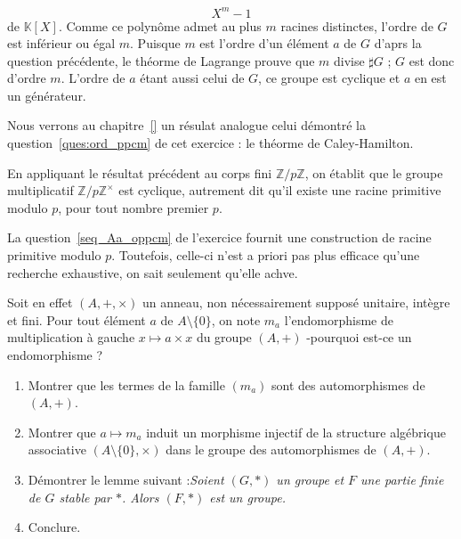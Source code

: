 \begin{sol}
\begin{enumerate}
\begin{equation}
X^m - 1
\label{}
\end{equation}
de \(\mathbb{K}[X]\). %
Comme ce polyn\^ome admet au plus \(m\) racines distinctes, l'ordre de \(G\) est inf\'erieur ou \'egal  \(m\). %
Puisque \(m\) est l'ordre d'un \'el\'ement \(a\) de \(G\) d'aprs la question pr\'ec\'edente, %
le th\'eorme de Lagrange prouve que \(m\) divise \(\sharp G\) ; %
\(G\) est donc d'ordre \(m\). %
L'ordre de \(a\) \'etant aussi celui de \(G\), ce groupe est cyclique et \(a\) en est un g\'en\'erateur.
\end{enumerate}
\end{sol}

\begin{rema}
Nous verrons au chapitre~\ref{} un r\'esulat analogue  celui d\'emontr\'e  la question~\ref{ques:ord_ppcm} de cet exercice : %
le th\'eorme de Caley-Hamilton.
\end{rema}

\begin{rema}
En appliquant le r\'esultat pr\'ec\'edent au corps fini \(\mathbb{Z} / p\mathbb{Z}\), on \'etablit que le groupe multiplicatif \(\mathbb{Z} / p\mathbb{Z}^{\times}\) est cyclique, %
autrement dit qu'il existe une racine primitive modulo \(p\), pour tout nombre premier \(p\).
\end{rema}

\begin{rema}
La question~\ref{seq_Aa_oppcm} de l'exercice fournit une construction de racine primitive modulo \(p\). %
Toutefois, celle-ci n'est a priori pas plus efficace qu'une recherche exhaustive, on sait seulement qu'elle achve.
\end{rema}

\begin{exer}[Tout anneau intègre et fini est un corps]%
Soit en effet $(A,+,\times)$ un anneau, non nécessairement supposé unitaire, intègre et fini. %
Pour tout élément $a$ de $A \setminus \{0\}$, on note $m_a$ l'endomorphisme de multiplication à gauche %
$x \mapsto a \times x$ du groupe $(A,+)$ -pourquoi est-ce un endomorphisme ?
\begin{enumerate}
\item Montrer que les termes de la famille $(m_a)$ sont des automorphismes de $(A,+)$.
\item Montrer que $a \mapsto m_a$ induit un morphisme injectif de la structure algébrique associative %
$(A \setminus \{0\}, \times)$ dans le groupe des automorphismes de $(A,+)$.
\item Démontrer le lemme suivant :\textit{Soient $(G,\ast)$ un groupe et $F$ %
une partie finie de $G$ stable par $\ast$. Alors $(F,\ast)$ est un groupe.}
\item Conclure.
\end{enumerate}
\end{exer}